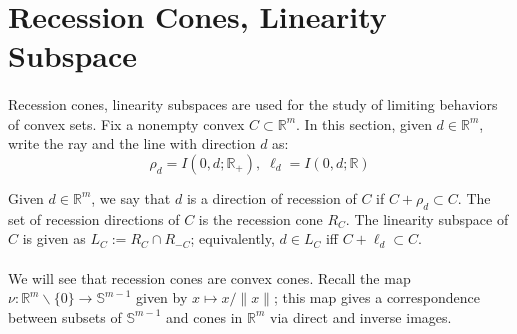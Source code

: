 \section{Recession Cones, Linearity Subspace}
\label{sect:013}

\paragraph{}Recession cones, linearity subspaces are used for the study of limiting behaviors of convex sets. Fix a nonempty convex $C\subset \mathbb{R}^m$. In this section, given $d\in \mathbb{R}^m$, write the ray and the line with direction $d$ as:
\[
	\rho_d=I(0,d;\mathbb{R}_{+}),\;\ell_d=I(0,d;\mathbb{R})
\]

\begin{defn}
	\label{defn:013-recessioncone}
	Given $d\in \mathbb{R}^m$, we say that $d$ is a direction of recession of $C$ if $C+\rho_d\subset C$.	The set of recession directions of $C$ is the recession cone $R_C$. The linearity subspace of $C$ is given as $L_C:=R_C\cap R_{-C}$; equivalently, $d\in L_C$ iff $C+\ell_d\subset C$.
\end{defn}

\paragraph{}We will see that recession cones are convex cones. Recall the map $\nu:\mathbb{R}^m\smallsetminus\{0\}\to \mathbb{S}^{m-1}$ given by $x\mapsto x/\|x\|$; this map gives a correspondence between subsets of $\mathbb{S}^{m-1}$ and cones in $\mathbb{R}^m$ via direct and inverse images.

